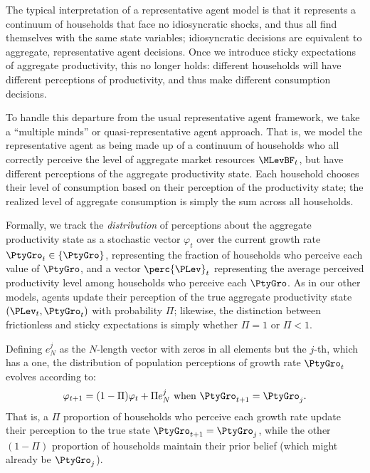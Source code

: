 The typical interpretation of a representative agent model is that
it represents a continuum of households that face no idiosyncratic shocks, and
thus all find themselves with the same state variables; idiosyncratic decisions
are equivalent to aggregate, representative agent decisions.  Once we introduce
sticky expectations of aggregate productivity, this no longer holds: different
households will have different perceptions of productivity, and thus make
different consumption decisions.

To handle this departure from the usual representative agent framework,
we take a ``multiple minds'' or quasi-representative agent approach.  That is,
we model the representative agent as being made up of a continuum of
households who all correctly perceive the level of aggregate market
resources $\MLevBF_t$, but have different perceptions of the aggregate productivity
state.  Each household chooses their level of consumption based on their
perception of the productivity state; the realized level of aggregate consumption
is simply the sum across all households.

Formally, we track the \textit{distribution} of perceptions about the aggregate productivity
state as a stochastic vector $\varphi_t$ over the current growth rate $\PtyGro_t \in \{\PtyGro\}$,
representing the fraction of households who perceive each value of $\PtyGro$,
and a vector $\perc{\PLev}_t$ representing the average perceived productivity
level among households who perceive each $\PtyGro$.  As in our other models,
agents update their perception of the true aggregate
productivity state $(\PLev_t,\PtyGro_t)$ with probability $\Pi$; likewise, the
distinction between frictionless and sticky expectations is simply whether $\Pi=1$
or $\Pi < 1$.

Defining $e^j_N$ as the $N$-length vector with zeros in all elements but the
$j$-th, which has a one, the distribution of population perceptions of growth
rate $\PtyGro_t$ evolves according to:
\begin{equation}\label{eq:PtyGroPerc}
\varphi_{t+1} = (1 - \Pi) \varphi_{t} + \Pi e_N^j \text{ when } \PtyGro_{t+1} = \PtyGro_j.
\end{equation}
That is, a $\Pi$ proportion of households who perceive each growth rate update
their perception to the true state $\PtyGro_{t+1} = \PtyGro_j$, while the other $(1-\Pi)$
proportion of households maintain their prior belief (which might already be $\PtyGro_j$).


